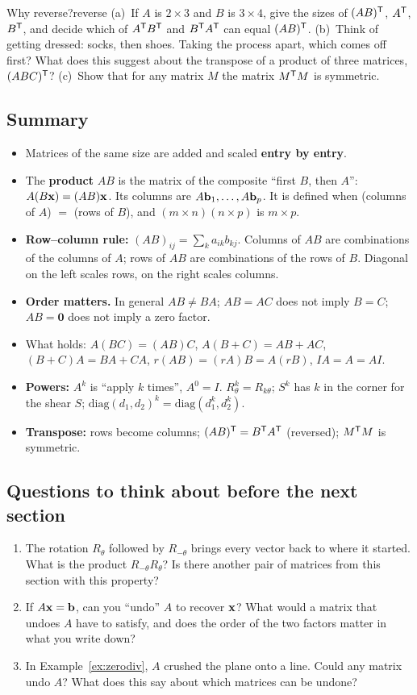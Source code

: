 \documentclass[11pt]{article}
\begin{document}
\begin{think}{Why reverse?}{reverse}
(a)~If $A$ is $2\times3$ and $B$ is $3\times4$, give the sizes of $(AB)^{\mathsf T}$, $A^{\mathsf T}$, $B^{\mathsf T}$, and decide which of $A^{\mathsf T} B^{\mathsf T}$ and $B^{\mathsf T} A^{\mathsf T}$ can equal $(AB)^{\mathsf T}$. (b)~Think of getting dressed: socks, then shoes. Taking the process apart, which comes off first? What does this suggest about the transpose of a product of three matrices, $(ABC)^{\mathsf T}$? (c)~Show that for any matrix $M$ the matrix $M^{\mathsf T} M$ is symmetric.
\end{think}

\subsection*{Summary}
\begin{itemize}
  \item Matrices of the same size are added and scaled \textbf{entry by entry}.
  \item The \textbf{product} $AB$ is the matrix of the composite ``first $B$, then $A$'': $A(B\mathbf{x})=(AB)\mathbf{x}$. Its columns are $A\mathbf{b}_1,\dots,A\mathbf{b}_p$. It is defined when (columns of $A$) $=$ (rows of $B$), and $(m\times n)(n\times p)$ is $m\times p$.
  \item \textbf{Row--column rule:} $(AB)_{ij}=\sum_k a_{ik}b_{kj}$. Columns of $AB$ are combinations of the columns of $A$; rows of $AB$ are combinations of the rows of $B$. Diagonal on the left scales rows, on the right scales columns.
  \item \textbf{Order matters.} In general $AB\neq BA$; $AB=AC$ does not imply $B=C$; $AB=\mathbf{0}$ does not imply a zero factor.
  \item What holds: $A(BC)=(AB)C$, $A(B+C)=AB+AC$, $(B+C)A=BA+CA$, $r(AB)=(rA)B=A(rB)$, $IA=A=AI$.
  \item \textbf{Powers:} $A^k$ is ``apply $k$ times'', $A^0=I$. $R_\theta^k=R_{k\theta}$; $S^k$ has $k$ in the corner for the shear $S$; $\mathrm{diag}(d_1,d_2)^k=\mathrm{diag}(d_1^k,d_2^k)$.
  \item \textbf{Transpose:} rows become columns; $(AB)^{\mathsf T}=B^{\mathsf T} A^{\mathsf T}$ (reversed); $M^{\mathsf T} M$ is symmetric.
\end{itemize}

\subsection*{Questions to think about before the next section}
\begin{enumerate}
  \item The rotation $R_\theta$ followed by $R_{-\theta}$ brings every vector back to where it started. What is the product $R_{-\theta}R_\theta$? Is there another pair of matrices from this section with this property?
  \item If $A\mathbf{x}=\mathbf{b}$, can you ``undo'' $A$ to recover $\mathbf{x}$? What would a matrix that undoes $A$ have to satisfy, and does the order of the two factors matter in what you write down?
  \item In Example~\ref{ex:zerodiv}, $A$ crushed the plane onto a line. Could any matrix undo $A$? What does this say about which matrices can be undone?
\end{enumerate}
\end{document}
